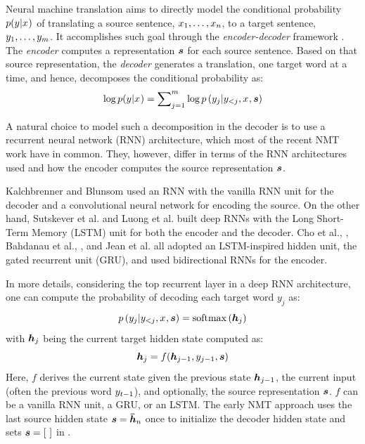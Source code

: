 Neural machine translation aims to directly model the conditional probability $p(y_{}|x_{})$ of translating
a source sentence, $x_{1},\ldots,x_{n}$, to a target sentence, $y_{1},\ldots,y_{m}$.
It accomplishes such goal through the {\it encoder-decoder} framework \cite{sutskever14,cho14}. The {\it encoder} computes a representation $\mbox{\boldmath{$s$}}$
for each source sentence. Based on that source representation,
the {\it decoder} generates a translation, one target word at a time, and hence, decomposes the conditional probability as:
\begin{equation}
\log p(y_{}|x_{}) = \sum_{j=1}^m \nolimits \log
p\left(y_{j}|y_{<j},x_{},\mbox{\boldmath{$s$}}\right)
\end{equation}

A natural choice to model such a decomposition in the decoder is to use a
recurrent neural network (RNN) architecture, which most of the recent NMT work have in common. They,
however, differ in terms of the RNN architectures used and how the encoder computes the source representation $\mbox{\boldmath{$s$}}$.

Kalchbrenner and Blunsom \cite{kal13} used an RNN with the vanilla RNN unit for the decoder and a
convolutional neural network for encoding the source. On
the other hand, Sutskever et al. \cite{sutskever14} and Luong et al.
\cite{luong15,luong15attn} built deep RNNs with the Long Short-Term Memory (LSTM) unit
\cite{lstm97} for both the encoder and the decoder. Cho et al., \cite{cho14}, Bahdanau et al.,
\cite{bog15}, and Jean et al. \cite{jean15,mono15} all adopted an
LSTM-inspired hidden unit, the gated recurrent unit (GRU), and used bidirectional
RNNs for the encoder.

In more details, considering the top recurrent layer in a deep RNN architecture, one can compute the probability of decoding each target word $y_j$ as:
\begin{equation}
p\left(y_{j}|y_{<j},x_{},\mbox{\boldmath{$s$}}\right) = \operatorname{softmax}\left(\mbox{\boldmath{$h$}}_{j}\right)
\end{equation}
with $\mbox{\boldmath{$h$}}_{j}$ being the current target hidden state computed as:
\begin{equation}
\label{e:rnn}
\mbox{\boldmath{$h$}}_{j} = f(\mbox{\boldmath{$h$}}_{j-1}, y_{j-1}, \mbox{\boldmath{$s$}})
\end{equation}
Here, $f$ derives the current state given the previous state
$\mbox{\boldmath{$h$}}_{j-1}$, the
current input (often the previous word $y_{t-1}$), and optionally, the source
representation $\mbox{\boldmath{$s$}}$.
$f$ can be a vanilla RNN unit, a GRU, or an LSTM. 
The early NMT approach  \cite{kal13,sutskever14,cho14,luong15} uses the last source hidden state
$\mbox{\boldmath{$s$}}=\mbox{\boldmath{$\bar{h}$}}_{n}$ once to initialize the decoder hidden state and sets $\mbox{\boldmath{$s$}}=[\text{ }]$ in
.

